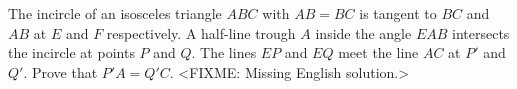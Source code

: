 \problem
The incircle of an isosceles triangle $ABC$ with $AB = BC$ is tangent to $BC$
and $AB$ at $E$ and $F$ respectively.
A half-line trough $A$ inside the angle $EAB$ intersects the incircle at points
$P$ and $Q$.
The lines $EP$ and $EQ$ meet the line $AC$ at $P'$ and $Q'$.
Prove that $P'A = Q'C$.
\solution
<FIXME: Missing English solution.>
\endproblem

